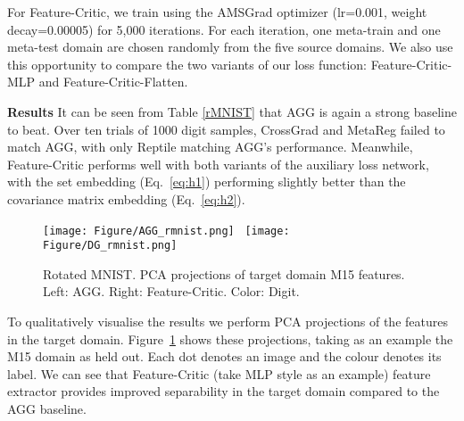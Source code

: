 \documentclass{article}
\newcommand{\modelname}{Feature-Critic}
\newcommand{\keypoint}[1]{\vspace{0.0cm}\noindent\textbf{#1}\quad}
\begin{document}
For \modelname{}, we train using the AMSGrad optimizer (lr=0.001, weight decay=0.00005) for 5,000 iterations. For each iteration, one meta-train and one meta-test domain are chosen randomly from the five source domains. We also use this opportunity to compare the two variants of our loss function: \modelname{}-MLP and \modelname{}-Flatten.

\keypoint{Results} 
It can be seen from Table \ref{rMNIST} that AGG is again a strong baseline to beat. Over ten trials of 1000 digit samples, CrossGrad and MetaReg failed to match AGG, with only Reptile matching AGG's performance. Meanwhile, \modelname{} performs well with both variants of the auxiliary loss network, with the set embedding (Eq.~\ref{eq:h1}) performing slightly better than the covariance matrix embedding (Eq.~\ref{eq:h2}). 


\begin{figure}[tb]
\centering
\texttt{[image: Figure/AGG\_rmnist.png]}~
\texttt{[image: Figure/DG\_rmnist.png]}
\caption{ Rotated MNIST. PCA projections of target domain M15 features. Left: AGG. Right: \modelname{}. Color: Digit.} \label{fig:3}
\end{figure}

To qualitatively visualise the results we perform PCA projections of the features in the target domain. Figure~\ref{fig:3} shows these projections, taking as an example the M15 domain as held out. Each dot denotes an image and the colour denotes its label. We can see that \modelname{} (take MLP style as an example) feature extractor provides improved separability in the target domain compared to the AGG baseline. 
\end{document}
